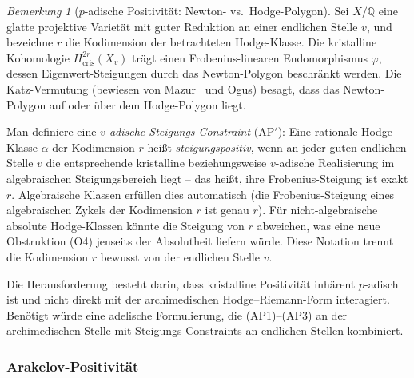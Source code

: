\documentclass[aps,prd,twocolumn,superscriptaddress,nofootinbib]{revtex4-2}
\theoremstyle{definition}
\theoremstyle{remark}
\newtheorem{remark}[theorem]{Bemerkung}
\begin{document}
\begin{remark}[$p$-adische Positivität: Newton- vs.\ Hodge-Polygon]
\label{rem:newton-hodge}
Sei $X/\mathbb{Q}$ eine glatte projektive Varietät mit guter Reduktion an einer endlichen Stelle $v$, und bezeichne $r$ die Kodimension der betrachteten Hodge-Klasse. Die kristalline Kohomologie $H^{2r}_{\mathrm{cris}}(X_v)$ trägt einen Frobenius-linearen Endomorphismus $\varphi$, dessen Eigenwert-Steigungen durch das Newton-Polygon beschränkt werden. Die Katz-Vermutung (bewiesen von Mazur~\cite{Mazur1972} und Ogus) besagt, dass das Newton-Polygon auf oder über dem Hodge-Polygon liegt.

Man definiere eine \textit{$v$-adische Steigungs-Constraint} (AP$'$): Eine rationale Hodge-Klasse $\alpha$ der Kodimension $r$ heißt \textit{steigungspositiv}, wenn an jeder guten endlichen Stelle $v$ die entsprechende kristalline beziehungsweise $v$-adische Realisierung im \glqq algebraischen Steigungsbereich\grqq{} liegt -- das heißt, ihre Frobenius-Steigung ist exakt $r$. Algebraische Klassen erfüllen dies automatisch (die Frobenius-Steigung eines algebraischen Zykels der Kodimension $r$ ist genau $r$). Für nicht-algebraische absolute Hodge-Klassen könnte die Steigung von $r$ abweichen, was eine neue Obstruktion (O4) jenseits der Absolutheit liefern würde. Diese Notation trennt die Kodimension $r$ bewusst von der endlichen Stelle $v$.

Die Herausforderung besteht darin, dass kristalline Positivität inhärent $p$-adisch ist und nicht direkt mit der archimedischen Hodge--Riemann-Form interagiert. Benötigt würde eine adelische Formulierung, die (AP1)--(AP3) an der archimedischen Stelle mit Steigungs-Constraints an endlichen Stellen kombiniert.
\end{remark}

\subsubsection{Arakelov-Positivität}
\end{document}
